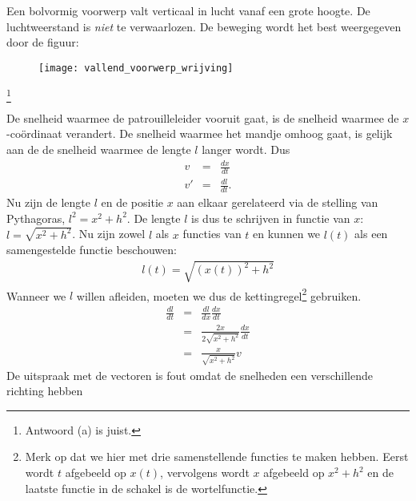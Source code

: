 \documentclass{ximera}
\begin{document}
\begin{exercise} Een bolvormig voorwerp valt verticaal in lucht vanaf een grote
hoogte. De luchtweerstand is \textit{niet} te verwaarlozen. De
beweging wordt het best weergegeven door de figuur:
\begin{figure}[h]
\begin{center}
\texttt{[image: vallend\_voorwerp\_wrijving]}
\end{center}
\end{figure}
\footnote{Antwoord (a) is juist.}

\begin{oplossing}
\item De snelheid waarmee de patrouilleleider vooruit gaat, is de snelheid waarmee de $x$-co\"ordinaat verandert. De snelheid waarmee het mandje omhoog gaat, is gelijk aan de de snelheid waarmee de lengte $l$ langer wordt. Dus
\begin{eqnarray*}
v&=&\frac{dx}{dt}\\
v'&=&\frac{dl}{dt}.
\end{eqnarray*}
Nu zijn de lengte $l$ en de positie $x$ aan elkaar gerelateerd via de stelling van Pythagoras, $l^2=x^2+h^2$. De lengte $l$ is dus te schrijven in functie van $x$: $l=\sqrt{x^2+h^2}$. Nu zijn zowel $l$ als $x$ functies van $t$ en kunnen we $l(t)$ als een samengestelde functie beschouwen:
\begin{eqnarray*}
l(t)=\sqrt{\left(x(t)\right)^2+h^2}
\end{eqnarray*}
Wanneer we $l$ willen afleiden, moeten we dus de kettingregel\footnote{Merk op dat we hier met drie samenstellende functies te maken hebben. Eerst wordt $t$ afgebeeld op $x(t)$, vervolgens wordt $x$ afgebeeld op $x^2+h^2$ en de laatste functie in de schakel is de wortelfunctie.} gebruiken.
\begin{eqnarray*}
\frac{dl}{dt}&=&\frac{dl}{dx}\frac{dx}{dt}\\
&=&\frac{2x}{2\sqrt{x^2+h^2}}\frac{dx}{dt}\\
&=&\frac{x}{\sqrt{x^2+h^2}}v
\end{eqnarray*}
De uitspraak met de vectoren is fout omdat de snelheden een verschillende richting hebben
\end{oplossing}

\end{exercise}
\end{document}
